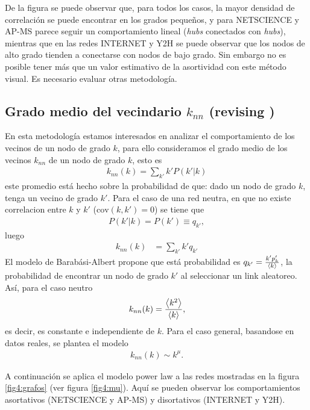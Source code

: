 De la figura se puede observar que, para todos los casos, la mayor densidad de correlaci\'on se puede encontrar en los 
grados peque\~nos, y para NETSCIENCE y AP-MS parece seguir un comportamiento lineal (\textit{hubs} conectados 
con \textit{hubs}), mientras que en las redes INTERNET y Y2H se puede observar que los nodos de alto grado tienden a 
conectarse con nodos de bajo grado. Sin embargo no es posible tener m\'as que un valor estimativo de la asortividad
con este m\'etodo visual. Es necesario evaluar otras metodolog\'ia.



\subsection{Grado medio del vecindario $k_{nn}$ (revising \citet{barabasi})}
En esta metodolog\'ia estamos interesados en analizar el comportamiento de los vecinos de un nodo de grado $k$, para
ello consideramos el grado medio de los vecinos $k_{nn}$ de un nodo de grado $k$, esto es
\begin{align*}
    k_{nn}(k) = \sum_{k'} k' P(k'|k)
\end{align*}
este promedio est\'a hecho sobre la probabilidad de que: dado un nodo de grado $k$, tenga un vecino de grado $k'$.
Para el caso de una red neutra, en que no existe correlacion entre $k$ y $k'$ ($\text{cov}\left(k,k'\right)=0$) se tiene que
\begin{align*}
    P(k'|k) = P(k') \equiv q_{k'},
\end{align*}
luego 
\begin{align*}
    k_{nn}(k) &= \sum_{k'} k' q_{k'}
\end{align*}
El modelo de Barab\'asi-Albert propone que est\'a probabilidad es $q_{k'} = \frac{k' p_k'}{\left\langle k\right\rangle}$, la probabilidad de 
encontrar un nodo de grado $k'$ al seleccionar un link aleatoreo. As\'i, para el caso neutro
\begin{align*}
    k_{nn}(k) = \frac{\left\langle k^2\right\rangle}{\left\langle k\right\rangle},
\end{align*}
es decir, es constante e independiente de $k$.
Para el caso general, basandose en datos reales, se plantea el modelo 
\begin{align}
    k_{nn}(k) \sim k^\mu.
    \label{knn}
\end{align}

A continuaci\'on se aplica el modelo power law a las redes mostradas en la figura \ref{fig4:grafos} (ver figura \ref{fig4:mu}).
 Aqu\'i se pueden observar los comportamientos asortativos (NETSCIENCE y AP-MS) y disortativos (INTERNET y Y2H).


